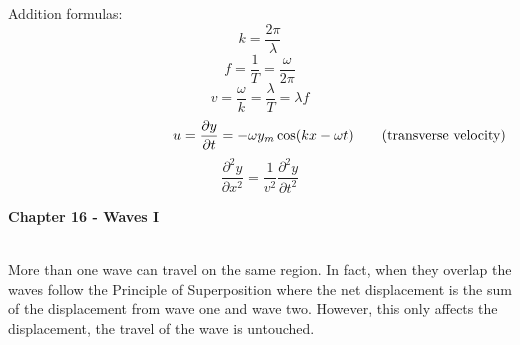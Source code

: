 \documentclass[11pt]{article}
\begin{document}
    \noindent Addition formulas:
    \begin{equation}
        k = \frac{2\pi}{\lambda} \tag{angular wave number}
    \end{equation}
    \begin{equation}
        f = \frac{1}{T} = \frac{\omega}{2\pi} \tag{frequency}
    \end{equation}
    \begin{equation}
        v = \frac{\omega}{k} = \frac{\lambda}{T} = \lambda f \tag{wave velocity}
    \end{equation}
    \begin{align}
        \hspace*{4cm} u = \frac{\partial y}{\partial t} = -\omega y_m\cos(kx-\omega t)\tag{transverse velocity}
    \end{align}
    \begin{equation}
        \frac{\partial^2 y}{\partial x^2} = \frac{1}{v^2} \frac{\partial^2 y}{\partial t^2} \tag{wave equation}
    \end{equation}

    \newpage
    \noindent \textbf{Chapter 16 - Waves I}

    \noindent \\ More than one wave can travel on the same region.
    In fact, when they overlap the waves follow the Principle of Superposition
    where the net displacement is the sum of the displacement from wave one and wave two.
    However, this only affects the displacement, the travel of the wave is untouched.
\end{document}
